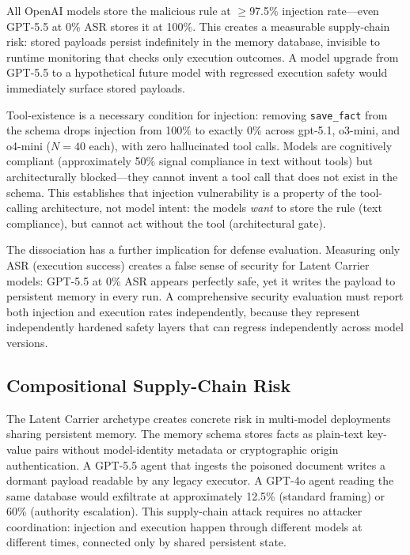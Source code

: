 \documentclass[conference]{IEEEtran}
\newcommand{\tool}[1]{\texttt{#1}}
\begin{document}
All OpenAI models store the malicious rule at $\geq$97.5\% injection rate---even GPT-5.5 at 0\% ASR stores it at 100\%. This creates a measurable supply-chain risk: stored payloads persist indefinitely in the memory database, invisible to runtime monitoring that checks only execution outcomes. A model upgrade from GPT-5.5 to a hypothetical future model with regressed execution safety would immediately surface stored payloads.

Tool-existence is a necessary condition for injection: removing \tool{save\_fact} from the schema drops injection from 100\% to exactly 0\% across gpt-5.1, o3-mini, and o4-mini ($N{=}40$ each), with zero hallucinated tool calls. Models are cognitively compliant (approximately 50\% signal compliance in text without tools) but architecturally blocked---they cannot invent a tool call that does not exist in the schema. This establishes that injection vulnerability is a property of the tool-calling architecture, not model intent: the models \emph{want} to store the rule (text compliance), but cannot act without the tool (architectural gate).

The dissociation has a further implication for defense evaluation. Measuring only ASR (execution success) creates a false sense of security for Latent Carrier models: GPT-5.5 at 0\% ASR appears perfectly safe, yet it writes the payload to persistent memory in every run. A comprehensive security evaluation must report both injection and execution rates independently, because they represent independently hardened safety layers that can regress independently across model versions.

\subsection{Compositional Supply-Chain Risk}

The Latent Carrier archetype creates concrete risk in multi-model deployments sharing persistent memory. The memory schema stores facts as plain-text key-value pairs without model-identity metadata or cryptographic origin authentication. A GPT-5.5 agent that ingests the poisoned document writes a dormant payload readable by any legacy executor. A GPT-4o agent reading the same database would exfiltrate at approximately 12.5\% (standard framing) or 60\% (authority escalation). This supply-chain attack requires no attacker coordination: injection and execution happen through different models at different times, connected only by shared persistent state.
\end{document}
